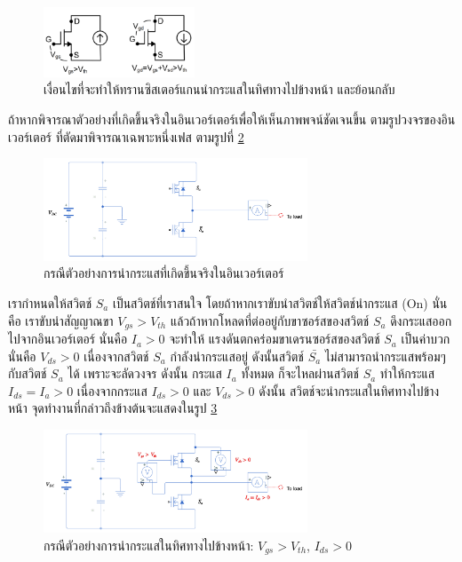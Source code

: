 \documentclass[11pt,a4paper]{article}
\begin{document}
\begin{figure}[h!]
    \centering
    \includegraphics[width=0.4\textwidth]{gan_on_condition.png}
    \caption{เงื่อนไขที่จะทำให้ทรานซิสเตอร์แกนนำกระแสในทิศทางไปข้างหน้า และย้อนกลับ}
    \label{gan_on_condition}
\end{figure}

ถ้าหากพิจารณาตัวอย่างที่เกิดขึ้นจริงในอินเวอร์เตอร์เพื่อให้เห็นภาพพจน์ชัดเจนขึ้น ตามรูปวงจรของอินเวอร์เตอร์ ที่ตัดมาพิจารณาเฉพาะหนึ่งเฟส ตามรูปที่ \ref{inverter1p}

\begin{figure}[h!]
    \centering
    \includegraphics[width=0.7\textwidth]{first_third_inverter.png}
    \caption{กรณีตัวอย่างการนำกระแสที่เกิดขึ้นจริงในอินเวอร์เตอร์}
    \label{inverter1p}
\end{figure}

เรากำหนดให้สวิตช์ $S_a$ เป็นสวิตช์ที่เราสนใจ โดยถ้าหากเราขับนำสวิตช์ให้สวิตช์นำกระแส (On) นั่นคือ เราขับนำสัญญาณขา $V_{gs} > V_{th}$ แล้วถ้าหากโหลดที่ต่ออยู่กับขาซอร์สของสวิตช์ $S_a$ ดึงกระแสออกไปจากอินเวอร์เตอร์ นั่นคือ $I_a > 0$ จะทำให้ แรงดันตกคร่อมขาเดรนซอร์สของสวิตช์ $S_a$ เป็นค่าบวก นั่นคือ $V_{ds} > 0$ เนื่องจากสวิตช์ $S_a$ กำลังนำกระแสอยู่ ดังนั้นสวิตช์ $\bar{S_a}$ ไม่สามารถนำกระแสพร้อมๆ กับสวิตช์ $S_a$ ได้ เพราะจะลัดวงจร ดังนั้น กระแส $I_a$ ทั้งหมด ก็จะไหลผ่านสวิตช์ $S_a$ ทำให้กระแส $I_{ds} = I_a > 0$ เนื่องจากกระแส $I_{ds} > 0$ และ $V_{ds} > 0$ ดังนั้น สวิตช์จะนํากระแสในทิศทางไปข้างหน้า จุดทำงานที่กล่าวถึงข้างต้นจะแสดงในรูป \ref{inverter_q1}

\begin{figure}[h!]
    \centering
    \includegraphics[width=0.7\textwidth]{inverter_q1.png}
    \caption{กรณีตัวอย่างการนำกระแสในทิศทางไปข้างหน้า: $V_{gs} > V_{th}$, $I_{ds} > 0$}
    \label{inverter_q1}
\end{figure}
\end{document}
